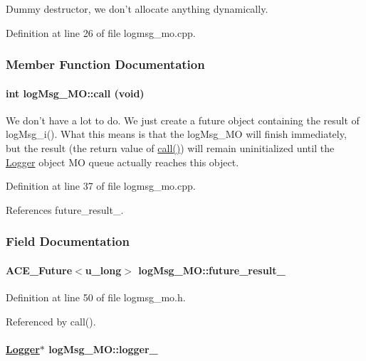 Dummy destructor, we don't allocate anything dynamically. 

Definition at line 26 of file logmsg\_\-mo.cpp.

\subsubsection{Member Function Documentation}
\hypertarget{classlogMsg__MO_logMsg__MOa2}{
\paragraph[call]{\setlength{\rightskip}{0pt plus 5cm}int log\-Msg\_\-MO::call (void)}\hfill}
\label{classlogMsg__MO_logMsg__MOa2}


We don't have a lot to do. We just create a future object containing the result of log\-Msg\_\-i(). What this means is that the log\-Msg\_\-MO will finish immediately, but the result (the return value of \hyperlink{classlogMsg__MO_logMsg__MOa2}{call()}) will remain uninitialized until the \hyperlink{classLogger}{Logger} object MO queue actually reaches this object. 

Definition at line 37 of file logmsg\_\-mo.cpp.

References future\_\-result\_\-.

\subsubsection{Field Documentation}
\hypertarget{classlogMsg__MO_logMsg__MOo2}{
\paragraph[future\_\-result\_\-]{\setlength{\rightskip}{0pt plus 5cm}ACE\_\-Future$<$u\_\-long$>$ log\-Msg\_\-MO::future\_\-result\_\-}\hfill}
\label{classlogMsg__MO_logMsg__MOo2}




Definition at line 50 of file logmsg\_\-mo.h.

Referenced by call().\hypertarget{classlogMsg__MO_logMsg__MOo0}{
\paragraph[logger\_\-]{\setlength{\rightskip}{0pt plus 5cm}\hyperlink{classLogger}{Logger}$\ast$ log\-Msg\_\-MO::logger\_\-}\hfill}
\label{classlogMsg__MO_logMsg__MOo0}





